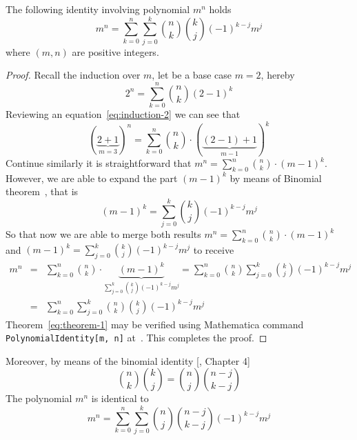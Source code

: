 \begin{thm}
    The following identity involving polynomial $m^n$ holds
    \begin{equation}
        m^n=\sum_{k=0}^{n}\sum_{j=0}^{k}\binom{n}{k}\binom{k}{j}(-1)^{k-j}m^j\label{eq:theorem-1}
    \end{equation}
    where $(m, n)$ are positive integers.
    \begin{proof}
        Recall the induction over $m$, let be a base case $m=2$, hereby
        \begin{equation}
            2^n=\sum_{k=0}^{n}\binom{n}{k}(2-1)^k\label{eq:induction-2}
        \end{equation}
        Reviewing an equation~\eqref{eq:induction-2} we can see that
        \begin{equation}
        (\underbrace{2+1}_{m=3})
            ^n=\sum_{k=0}^{n}\binom{n}{k}\cdot (\underbrace{(2-1)+1}_{m-1})^k\label{eq:induction-3}
        \end{equation}
        Continue similarly it is straightforward that $m^n = \sum_{k=0}^{n}\binom{n}{k} \cdot (m-1)^k$.
        However, we are able to expand the part $(m-1)^k$ by means of Binomial theorem~\cite{AbraSteg72}, that is
        \[
            (m-1)^k = \sum_{j=0}^{k} \binom{k}{j} (-1)^{k-j} m^j
        \]
        So that now we are able to merge both results $m^n = \sum_{k=0}^{n}\binom{n}{k} \cdot (m-1)^k$
        and $(m-1)^k = \sum_{j=0}^{k} \binom{k}{j} (-1)^{k-j} m^j$ to receive
        \begin{align*}
            \label{hyp8}
            m^n
            &=& \sum_{k=0}^{n} \binom{n}{k} \cdot \underbrace{(m-1)^k}_{\sum_{j=0}^{k} \binom{k}{j} (-1)^{k-j} m^j}
            =\sum_{k=0}^{n} \binom{n}{k} \sum_{j=0}^{k} \binom{k}{j} (-1)^{k-j} m^j\\
            &=& \sum_{k=0}^{n} \sum_{j=0}^{k} \binom{n}{k} \binom{k}{j} (-1)^{k-j} m^j
        \end{align*}
        Theorem~\eqref{eq:theorem-1} may be verified using Mathematica command \texttt{PolynomialIdentity[m, n]}
        at~\cite{PK22Source}.
        This completes the proof.
    \end{proof}
\end{thm}
Moreover, by means of the binomial identity [\cite{gross2016combinatorial}, Chapter 4]
\[
    \binom{n}{k} \binom{k}{j} = \binom{n}{j} \binom{n-j}{k-j}
\]
The polynomial $m^n$ is identical to
\[
    m^n = \sum_{k=0}^{n} \sum_{j=0}^{k} \binom{n}{j} \binom{n-j}{k-j} (-1)^{k-j} m^j
\]